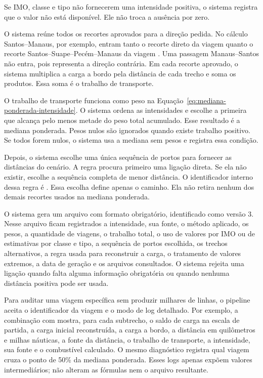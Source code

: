 Se IMO, classe e tipo não fornecerem uma intensidade positiva, o sistema registra que o valor não está disponível. Ele não troca a ausência por zero.

O sistema reúne todos os recortes aprovados para a direção pedida. No cálculo Santos--Manaus, por exemplo, entram tanto o recorte direto da viagem  quanto o recorte Santos--Suape--Pecém--Manaus da viagem . Uma passagem Manaus--Santos não entra, pois representa a direção contrária. Em cada recorte aprovado, o sistema multiplica a carga a bordo pela distância de cada trecho e soma os produtos. Essa soma é o trabalho de transporte.

O trabalho de transporte funciona como peso na Equação~\ref{eq:mediana-ponderada-intensidade}. O sistema ordena as intensidades e escolhe a primeira que alcança pelo menos metade do peso total acumulado. Esse resultado é a mediana ponderada. Pesos nulos são ignorados quando existe trabalho positivo. Se todos forem nulos, o sistema usa a mediana sem pesos e registra essa condição.

Depois, o sistema escolhe uma única sequência de portos para fornecer as distâncias do cenário. A regra procura primeiro uma ligação direta. Se ela não existir, escolhe a sequência completa de menor distância. O identificador interno dessa regra é . Essa escolha define apenas o caminho. Ela não retira nenhum dos demais recortes usados na mediana ponderada.

O sistema gera um arquivo com formato obrigatório, identificado como versão 3. Nesse arquivo ficam registrados a intensidade, sua fonte, o método aplicado, os pesos, a quantidade de viagens, o trabalho total, o uso de valores por IMO ou de estimativas por classe e tipo, a sequência de portos escolhida, os trechos alternativos, a regra usada para reconstruir a carga, o tratamento de valores extremos, a data de geração e os arquivos consultados. O sistema rejeita uma ligação quando falta alguma informação obrigatória ou quando nenhuma distância positiva pode ser usada.

Para auditar uma viagem específica sem produzir milhares de linhas, o pipeline aceita o identificador da viagem e o modo de log detalhado. Por exemplo, a combinação  com  mostra, para cada subtrecho, o saldo de carga na escala de partida, a carga inicial reconstruída, a carga a bordo, a distância em quilômetros e milhas náuticas, a fonte da distância, o trabalho de transporte, a intensidade, sua fonte e o combustível calculado. O mesmo diagnóstico registra qual viagem cruza o ponto de 50\% da mediana ponderada. Esses logs apenas expõem valores intermediários; não alteram as fórmulas nem o arquivo resultante.

